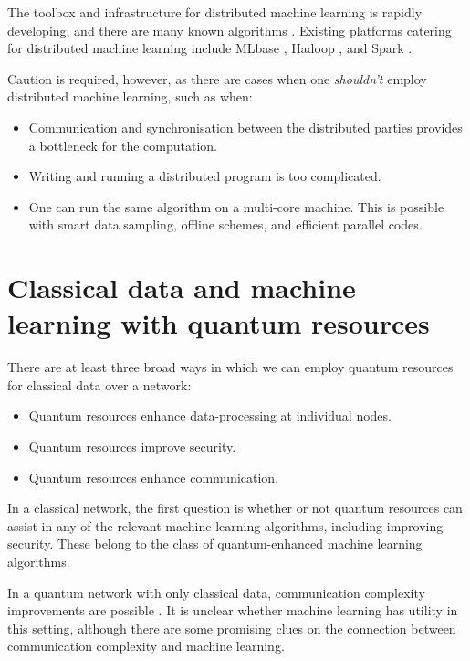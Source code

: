 \documentclass[twocolumn, aps, rmp, amsmath, amssymb, nofootinbib, superscriptaddress, longbibliography, floatfix, table-of-contents, eqsecnum]{revtex4}
\begin{document}
The toolbox and infrastructure for distributed machine learning is rapidly developing, and there are many known algorithms \cite{peteiro2013survey, florian2013}. Existing platforms catering for distributed machine learning include MLbase \cite{MLbase}, Hadoop \cite{white2012hadoop}, and Spark \cite{shanahan2015large}.

Caution is required, however, as there are cases when one \textit{shouldn't} employ distributed machine learning, such as when:
\begin{itemize}
\item Communication and synchronisation between the distributed parties provides a bottleneck for the computation.
\item Writing and running a distributed program is too complicated.
\item One can run the same algorithm on a multi-core machine. This is possible with smart data sampling, offline schemes, and efficient parallel codes.
\end{itemize}

\section{Classical data and machine learning with quantum resources}

There are at least three broad ways in which we can employ quantum resources for classical data over a network:
\begin{itemize}
\item Quantum resources enhance data-processing at individual nodes.
\item Quantum resources improve security.
\item Quantum resources enhance communication.
\end{itemize}

In a classical network, the first question is whether or not quantum resources can assist in any of the relevant machine learning algorithms, including improving security. These belong to the class of quantum-enhanced machine learning algorithms.

In a quantum network with only classical data, communication complexity improvements are possible \cite{brassard2003quantum}. It is unclear whether machine learning has utility in this setting, although there are some promising clues \cite{kane2017communication, balcan2012distributed, conitzer2004communication} on the connection between communication complexity and machine learning.
\end{document}
